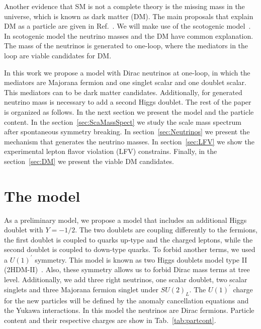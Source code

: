 \documentclass[12pt]{article}
\begin{document}
Another evidence that SM is not a complete theory is the missing mass in the universe, which is known as dark matter (DM). The main proposals that explain DM as a particle are given in Ref.~\cite{Bertone:2004pz}. We will make use of the scotogenic model~\cite{Ma:2006km}. In scotogenic model the neutrino masses and the DM have common explanation. The mass of the neutrinos is generated to one-loop, where the mediators in the loop are viable candidates for DM.

In this work we propose a model with Dirac neutrinos at one-loop, in which the mediators are Majorana fermion and one singlet scalar and one doublet scalar. This mediators can to be dark matter candidates. Additionally, for generated neutrino mass is necessary to add a second Higgs doublet. The rest of the paper is organized as follows. In the next section we present the model and the particle content. In the section~\ref{sec:ScaMassSpect} we study the scale mass spectrum after spontaneous symmetry breaking. In section~\ref{sec:Neutrinos} we present the mechanism that generates the neutrino masses. In section~\ref{sec:LFV} we show the experimental lepton flavor violation (LFV) constrains. Finally, in the section~\ref{sec:DM} we present the viable DM candidates.

\section{The model}
\label{sec:Model}
As a preliminary model, we propose a model that includes an additional Higgs doublet with $ Y = -1/2 $. The two doublets are coupling differently to the fermions, the first doublet is coupled to quarks up-type and the charged leptons, while the second doublet is coupled to down-type quarks. To forbid another terms, we used a $U(1)^{\prime}$ symmetry. This model is known as two Higgs doublets model type II (2HDM-II)~\cite{Davidson:2005cw}. Also, these symmetry allows us to forbid Dirac mass terms at tree level. Additionally, we add three right neutrinos, one scalar doublet, two scalar singlets and three Majorana fermion singlet under $SU(2)_L$. The $U(1)^{\prime}$ charge for the new particles will be defined by the anomaly cancellation equations and the Yukawa interactions. In this model the neutrinos are Dirac fermions. Particle content and their respective charges are show in Tab.~\ref{tab:partcont}. 
\end{document}
